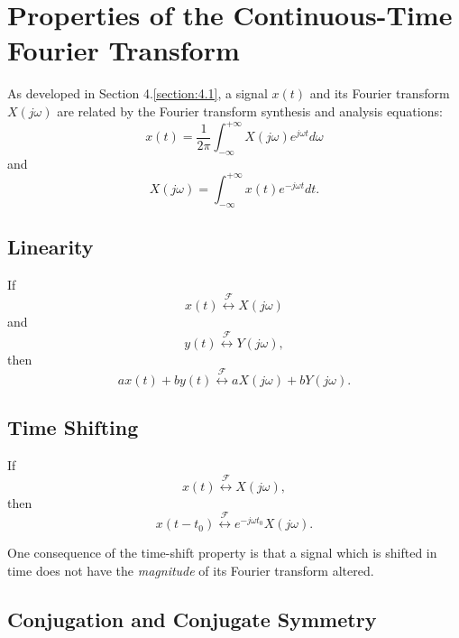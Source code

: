 \documentclass[a4paper,twoside]{book}
\begin{document}
\section{Properties of the Continuous-Time Fourier Transform}

As developed in Section 4.\ref{section:4.1}, a signal $x(t)$ and its Fourier transform $X(j\omega)$ are related by the Fourier transform synthesis and analysis equations:
\begin{equation}
    x(t)=\frac1{2\pi}\int_{-\infty}^{+\infty}X(j\omega)e^{j\omega t}d\omega
    \label{4.24}
\end{equation}
and
\begin{equation}
    X(j\omega)=\int_{-\infty}^{+\infty}x(t)e^{-j\omega t}dt.
    \label{4.25}
\end{equation}

\subsection{Linearity}

If $$x(t)\overset{\mathcal{F}}{\longleftrightarrow}X(j\omega)$$ and $$y(t)\overset{\mathcal{F}}{\longleftrightarrow}Y(j\omega),$$ then
\begin{equation}
    \boxed{ax(t)+by(t)\overset{\mathcal{F}}{\longleftrightarrow}aX(j\omega)+bY(j\omega).}
    \label{4.26}
\end{equation}

\subsection{Time Shifting}

If $$x(t)\overset{\mathcal{F}}{\longleftrightarrow}X(j\omega),$$ then
\begin{equation}
    \boxed{x(t-t_0)\overset{\mathcal{F}}{\longleftrightarrow}e^{-j\omega t_0}X(j\omega).}
    \label{4.27}
\end{equation}

One consequence of the time-shift property is that a signal which is shifted in time does not have the \textit{magnitude} of its Fourier transform altered.

\subsection{Conjugation and Conjugate Symmetry}
\end{document}
